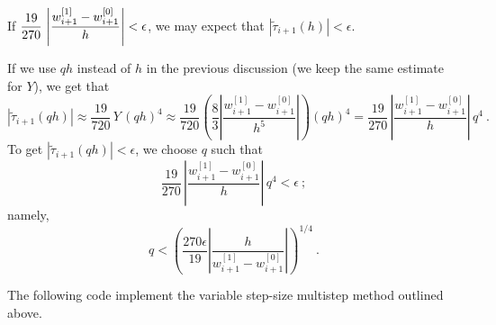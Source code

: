 If $\displaystyle \frac{19}{270}\,
\left| \frac{w_{i+1}^{[1]} - w_{i+1}^{[0]}}{h}\right| < \epsilon$,
we may expect that
$\left| \tilde{\tau}_{i+1}(h) \right| < \epsilon$.

If we use $qh$ instead of $h$ in the previous discussion (we keep the
same estimate for $Y$), we get that
\[
\left| \tilde{\tau}_{i+1}(qh) \right| \approx
\frac{19}{720}\, Y\,(qh)^4 \approx
\frac{19}{720}\left( \frac{8}{3}
\left| \frac{w_{i+1}^{[1]} - w_{i+1}^{[0]}}{h^5} \right| \right) (qh)^4 =
\frac{19}{270}\,\left| \frac{w_{i+1}^{[1]} - w_{i+1}^{[0]}}{h}\right|\,q^4
\ .
\]
To get $\left| \tilde{\tau}_{i+1}(qh) \right| < \epsilon$, we choose
$q$ such that
\[
\frac{19}{270}\,\left|\frac{w_{i+1}^{[1]} - w_{i+1}^{[0]}}{h}\right|\,q^4
< \epsilon \ ;
\]
namely,
\[
q < \left( \frac{270\epsilon}{19}\left|
\frac{h}{w_{i+1}^{[1]} - w_{i+1}^{[0]}}
\right|\right)^{1/4} \ .
\]

The following code implement the variable step-size multistep method
outlined above.

